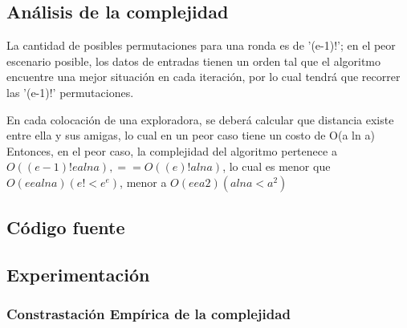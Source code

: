 \subsection{An\'alisis de la complejidad}
La cantidad de posibles permutaciones para una ronda es de '(e-1)!'; en el peor escenario posible, los datos de entradas tienen un orden tal que el algoritmo encuentre una mejor situación en cada iteración, por lo cual tendrá que recorrer las '(e-1)!' permutaciones. 

En cada colocación de una exploradora, se deberá calcular que distancia existe entre ella y sus amigas, lo cual en un peor caso tiene un costo de O(a ln a)
Entonces, en el peor caso, la complejidad del algoritmo pertenece a $O( (e-1)! e a ln a), == O( (e)! a ln a)$,   lo cual es menor que $O(ee a lna) (e! < e^e)$, menor a  $O(ee a2) (a ln a < a^2)$
\subsection{C\'odigo fuente}
\subsection{Experimentaci\'on}

\subsubsection{Constrastaci\'on Emp\'irica de la complejidad}\label{tiempos}
